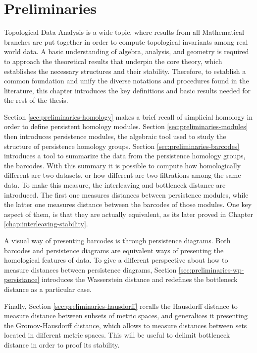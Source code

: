 \chapter{Preliminaries}

Topological Data Analysis is a wide topic, where results from all Mathematical branches are put together in order to compute topological invariants among real world data. A basic understanding of algebra, analysis, and geometry is required to approach the theoretical results that underpin the core theory, which establishes the necessary structures and their stability. Therefore, to establish a common foundation and unify the diverse notations and procedures found in the literature, this chapter introduces the key definitions and basic results needed for the rest of the thesis.

Section \ref{sec:preliminaries-homology} makes a 
brief recall of simplicial homology in order to define persistent homology modules. Section \ref{sec:preliminaries-modules} then introduces persistence modules, the algebraic tool used to study the structure of persistence homology groups. Section \ref{sec:preliminaries-barcodes} introduces a tool to summarize the data from the persistence homology groups, the barcodes. With this summary it is possible to compute how homologically different are two datasets, or how different are two filtrations among the same data. To make this measure, the interleaving and bottleneck distance are introduced. The first one measures distances between persistence modules, while the latter one measures distance between the barcodes of those modules. One key aspect of them, is that they are actually equivalent, as its later proved in Chapter \ref{chap:interleaving-stability}.

A visual way of presenting barcodes is through persistence diagrams. Both barcodes and persistence diagrams are equivalent ways of presenting the homological features of data. To give a different perspective about how to measure distances between persistence diagrams, Section \ref{sec:preliminaries-wp-persistance} introduces the Wasserstein distance and redefines the bottleneck distance as a particular case.

Finally, Section \ref{sec:preliminaries-hausdorff} recalls the Hausdorff distance to measure distance between subsets of metric spaces, and generalices it presenting the Gromov-Hausdorff distance, which allows to measure distances between sets located in different metric spaces. This will be useful to delimit bottleneck distance in order to proof its stability.


